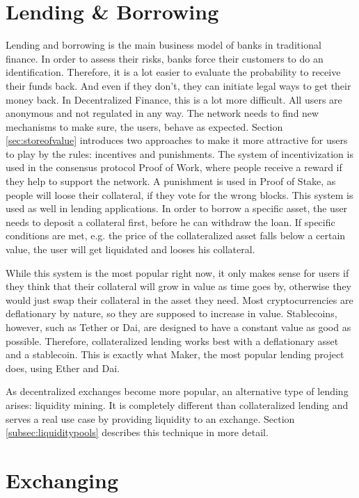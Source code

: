 \section{Lending \& Borrowing}
Lending and borrowing is the main business model of banks in traditional finance. In order to assess their risks, banks force their customers to do an identification. Therefore, it is a lot easier to evaluate the probability to receive their funds back. And even if they don't, they can initiate legal ways to get their money back.
In Decentralized Finance, this is a lot more difficult. All users are anonymous and not regulated in any way. The network needs to find new mechanisms to make sure, the users, behave as expected. Section \ref{sec:storeofvalue} introduces two approaches to make it more attractive for users to play by the rules: incentives and punishments. The system of incentivization is used in the consensus protocol Proof of Work, where people receive a reward if they help to support the network. A punishment is used in Proof of Stake, as people will loose their collateral, if they vote for the wrong blocks. This system is used as well in lending applications. In order to borrow a specific asset, the user needs to deposit a collateral first, before he can withdraw the loan. If specific conditions are met, e.g. the price of the collateralized asset falls below a certain value, the user will get liquidated and looses his collateral.

While this system is the most popular right now, it only makes sense for users if they think that their collateral will grow in value as time goes by, otherwise
they would just swap their collateral in the asset they need. Most cryptocurrencies are deflationary by nature, so they are supposed to increase in value.
Stablecoins, however, such as Tether or Dai, are designed to have a constant value as good as possible. Therefore, collateralized lending works best with a
deflationary asset and a stablecoin. This is exactly what Maker\cite{MakerDAO2021}, the most popular lending project does, using Ether and Dai.

As decentralized exchanges become more popular, an alternative type of lending arises: liquidity mining. It is completely different than collateralized lending and
serves a real use case by providing liquidity to an exchange. Section \ref{subsec:liquiditypools} describes this technique in more detail.


\section{Exchanging}
